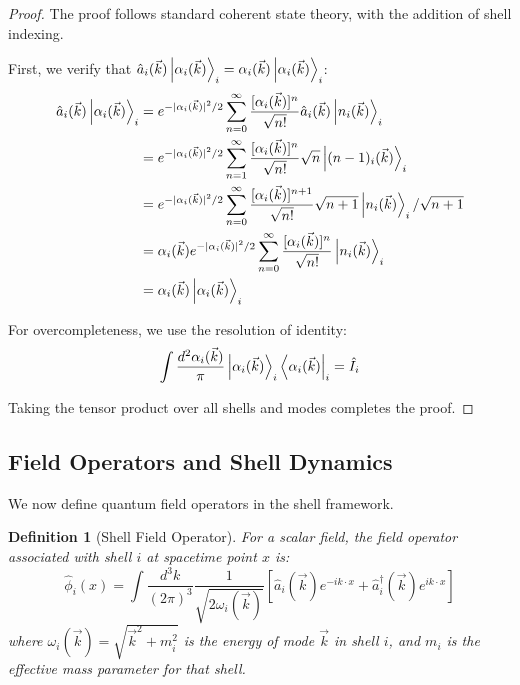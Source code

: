 \documentclass[12pt,a4paper]{article}
\newtheorem{definition}{Definition}[section]
\begin{document}
\begin{proof}
The proof follows standard coherent state theory, with the addition of shell indexing.

First, we verify that $\hat{a}_i(\vec{k}) \ket{\alpha_i(\vec{k})}_i = \alpha_i(\vec{k}) \ket{\alpha_i(\vec{k})}_i$:
\begin{align}
\hat{a}_i(\vec{k}) \ket{\alpha_i(\vec{k})}_i &= e^{-|\alpha_i(\vec{k})|^2/2} \sum_{n=0}^{\infty} \frac{[\alpha_i(\vec{k})]^n}{\sqrt{n!}} \hat{a}_i(\vec{k}) \ket{n_i(\vec{k})}_i \\
&= e^{-|\alpha_i(\vec{k})|^2/2} \sum_{n=1}^{\infty} \frac{[\alpha_i(\vec{k})]^n}{\sqrt{n!}} \sqrt{n} \ket{(n-1)_i(\vec{k})}_i \\
&= e^{-|\alpha_i(\vec{k})|^2/2} \sum_{n=0}^{\infty} \frac{[\alpha_i(\vec{k})]^{n+1}}{\sqrt{n!}} \sqrt{n+1} \ket{n_i(\vec{k})}_i / \sqrt{n+1} \\
&= \alpha_i(\vec{k}) e^{-|\alpha_i(\vec{k})|^2/2} \sum_{n=0}^{\infty} \frac{[\alpha_i(\vec{k})]^n}{\sqrt{n!}} \ket{n_i(\vec{k})}_i \\
&= \alpha_i(\vec{k}) \ket{\alpha_i(\vec{k})}_i
\end{align}

For overcompleteness, we use the resolution of identity:
\begin{equation}
\int \frac{d^2\alpha_i(\vec{k})}{\pi} \ket{\alpha_i(\vec{k})}_i \bra{\alpha_i(\vec{k})}_i = \hat{I}_i
\end{equation}

Taking the tensor product over all shells and modes completes the proof.
\end{proof}

\subsection{Field Operators and Shell Dynamics}
\label{subsec:field-operators}

We now define quantum field operators in the shell framework.

\begin{definition}[Shell Field Operator]
\label{def:field-operator}
For a scalar field, the field operator associated with shell $i$ at spacetime point $x$ is:
\begin{equation}
\hat{\phi}_i(x) = \int \frac{d^3k}{(2\pi)^3} \frac{1}{\sqrt{2\omega_i(\vec{k})}} \left[\hat{a}_i(\vec{k})e^{-ik \cdot x} + \hat{a}_i^{\dagger}(\vec{k})e^{ik \cdot x}\right]
\end{equation}
where $\omega_i(\vec{k}) = \sqrt{\vec{k}^2 + m_i^2}$ is the energy of mode $\vec{k}$ in shell $i$, and $m_i$ is the effective mass parameter for that shell.
\end{definition}
\end{document}

